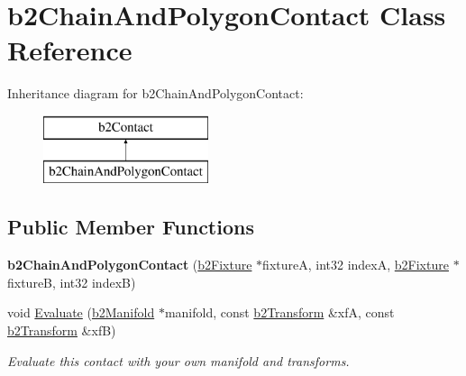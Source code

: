 \hypertarget{classb2_chain_and_polygon_contact}{}\section{b2\+Chain\+And\+Polygon\+Contact Class Reference}
\label{classb2_chain_and_polygon_contact}
Inheritance diagram for b2\+Chain\+And\+Polygon\+Contact\+:\begin{figure}[H]
\begin{center}
\leavevmode
\includegraphics[height=2.000000cm]{classb2_chain_and_polygon_contact}
\end{center}
\end{figure}
\subsection*{Public Member Functions}
\begin{DoxyCompactItemize}
\item 
{\bfseries b2\+Chain\+And\+Polygon\+Contact} (\hyperlink{classb2_fixture}{b2\+Fixture} $\ast$fixtureA, int32 indexA, \hyperlink{classb2_fixture}{b2\+Fixture} $\ast$fixtureB, int32 indexB)\hypertarget{classb2_chain_and_polygon_contact_ae43cd05c72ccaeb5f03efc5df944648b}{}\label{classb2_chain_and_polygon_contact_ae43cd05c72ccaeb5f03efc5df944648b}

\item 
void \hyperlink{classb2_chain_and_polygon_contact_a8c25ceb49d981797d0a7f8a1ea769442}{Evaluate} (\hyperlink{structb2_manifold}{b2\+Manifold} $\ast$manifold, const \hyperlink{structb2_transform}{b2\+Transform} \&xfA, const \hyperlink{structb2_transform}{b2\+Transform} \&xfB)\hypertarget{classb2_chain_and_polygon_contact_a8c25ceb49d981797d0a7f8a1ea769442}{}\label{classb2_chain_and_polygon_contact_a8c25ceb49d981797d0a7f8a1ea769442}

\begin{DoxyCompactList}\small\item\em Evaluate this contact with your own manifold and transforms. \end{DoxyCompactList}\end{DoxyCompactItemize}
